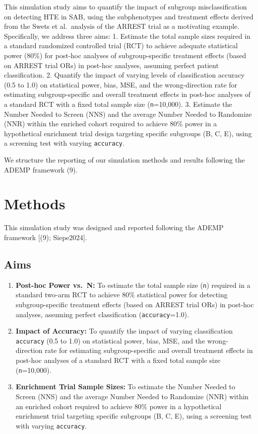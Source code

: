 \documentclass[
  letterpaper,
  DIV=11,
  numbers=noendperiod]{scrartcl}
\providecommand{\tightlist}{%
  \setlength{\itemsep}{0pt}\setlength{\parskip}{0pt}}
\begin{document}
This simulation study aims to quantify the impact of subgroup
misclassification on detecting HTE in SAB, using the subphenotypes and
treatment effects derived from the Swets et al.~analysis of the ARREST
trial as a motivating example. Specifically, we address three aims: 1.
Estimate the total sample sizes required in a standard randomized
controlled trial (RCT) to achieve adequate statistical power (80\%) for
post-hoc analyses of subgroup-specific treatment effects (based on
ARREST trial ORs) in post-hoc analyses, assuming perfect patient
classification. 2. Quantify the impact of varying levels of
classification accuracy (0.5 to 1.0) on statistical power, bias, MSE,
and the wrong-direction rate for estimating subgroup-specific and
overall treatment effects in post-hoc analyses of a standard RCT with a
fixed total sample size (\texttt{n}=10,000). 3. Estimate the Number
Needed to Screen (NNS) and the average Number Needed to Randomize (NNR)
within the enriched cohort required to achieve 80\% power in a
hypothetical enrichment trial design targeting specific subgroups (B, C,
E), using a screening test with varying \texttt{accuracy}.

We structure the reporting of our simulation methods and results
following the ADEMP framework (9).

\section{Methods}\label{methods}

This simulation study was designed and reported following the ADEMP
framework {[}(9); Siepe2024{]}.

\subsection{Aims}\label{aims}

\begin{enumerate}
\def\labelenumi{\arabic{enumi}.}
\tightlist
\item
  \textbf{Post-hoc Power vs.~N:} To estimate the total sample size
  (\texttt{n}) required in a standard two-arm RCT to achieve 80\%
  statistical power for detecting subgroup-specific treatment effects
  (based on ARREST trial ORs) in post-hoc analyses, assuming perfect
  classification (\texttt{accuracy}=1.0).
\item
  \textbf{Impact of Accuracy:} To quantify the impact of varying
  classification \texttt{accuracy} (0.5 to 1.0) on statistical power,
  bias, MSE, and the wrong-direction rate for estimating
  subgroup-specific and overall treatment effects in post-hoc analyses
  of a standard RCT with a fixed total sample size (\texttt{n}=10,000).
\item
  \textbf{Enrichment Trial Sample Sizes:} To estimate the Number Needed
  to Screen (NNS) and the average Number Needed to Randomize (NNR)
  within an enriched cohort required to achieve 80\% power in a
  hypothetical enrichment trial targeting specific subgroups (B, C, E),
  using a screening test with varying \texttt{accuracy}.
\end{enumerate}
\end{document}

